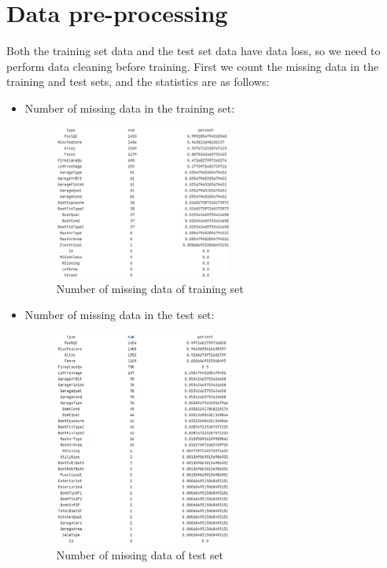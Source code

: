 \documentclass{amsart}
\begin{document}
	\section{Data pre-processing}\label{sec-intro}
	Both the training set data and the test set data have data loss, so we need to perform data cleaning before training. 
	First we count the missing data in the training and test sets, and the  statistics are as follows:
	\begin{itemize}
	\item Number of missing data in the training set:
	\begin{figure}[H]
		\centering
		\includegraphics[width=0.55\textwidth]{../Data/Fig4}
		\caption{Number of missing data of training set}\label{object}
	\end{figure}
	\item Number of missing data in the test set:
	\begin{figure}[H]
		\centering
		\includegraphics[width=0.55\textwidth]{../Data/Fig5}
		\caption{Number of missing data of test set}\label{object}
	\end{figure}

\end{itemize}
\end{document}
